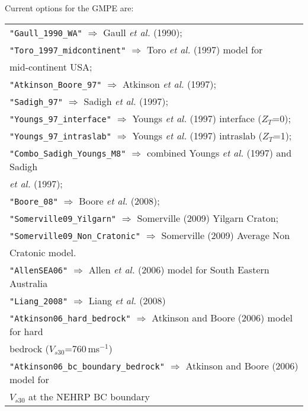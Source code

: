 Current options for the GMPE are: \\
\vspace{1em}
\begin{tabular}{|p{\textwidth}|}
\hline
\texttt{"Gaull\_1990\_WA"} $\Rightarrow$ Gaull \textit{et al.} (1990); \\
\texttt{"Toro\_1997\_midcontinent"}  $\Rightarrow$ Toro \textit{et al.} (1997) model for \\
    \hspace{8em} mid-continent USA; \\
\texttt{"Atkinson\_Boore\_97"}  $\Rightarrow$ Atkinson \textit{et al.} (1997); \\
\texttt{"Sadigh\_97"}  $\Rightarrow$ Sadigh \textit{et al.} (1997); \\
\texttt{"Youngs\_97\_interface"}  $\Rightarrow$ Youngs \textit{et al.} (1997) interface ($Z_T$=0); \\
\texttt{"Youngs\_97\_intraslab"}  $\Rightarrow$ Youngs \textit{et al.} (1997) intraslab ($Z_T$=1); \\
\texttt{"Combo\_Sadigh\_Youngs\_M8"}  $\Rightarrow$ combined Youngs \textit{et al.} (1997) and Sadigh \\
    \hspace{8em} \textit{et al.} (1997); \\
\texttt{"Boore\_08"}  $\Rightarrow$ Boore \textit{et al.} (2008); \\
\texttt{"Somerville09\_Yilgarn"} $\Rightarrow$ Somerville (2009) Yilgarn Craton; \\
\texttt{"Somerville09\_Non\_Cratonic"} $\Rightarrow$ Somerville (2009) Average Non \\
    \hspace{8em} Cratonic model. \\
\texttt{"AllenSEA06"} $\Rightarrow$ Allen \textit{et al.} (2006) model for South Eastern Australia \\
\texttt{"Liang\_2008"} $\Rightarrow$ Liang \textit{et al.} (2008) \\
\texttt{"Atkinson06\_hard\_bedrock"} $\Rightarrow$ Atkinson and Boore (2006) model for hard \\
    \hspace{8em} bedrock ($V_{s30}$=760\,ms$^{-1}$)\\
\texttt{"Atkinson06\_bc\_boundary\_bedrock"} $\Rightarrow$ Atkinson and Boore (2006) model for \\
\hspace{8em} $V_{s30}$ at the NEHRP BC boundary\\

\end{tabular}
